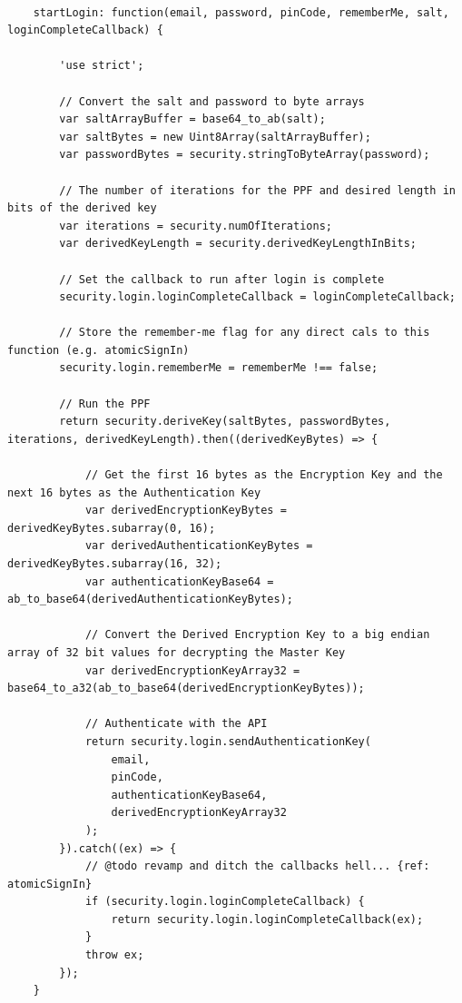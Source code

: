 \documentclass[letter,12pt]{article}
\begin{document}
\begin{verbatim}
    
    startLogin: function(email, password, pinCode, rememberMe, salt, loginCompleteCallback) {

        'use strict';

        // Convert the salt and password to byte arrays
        var saltArrayBuffer = base64_to_ab(salt);
        var saltBytes = new Uint8Array(saltArrayBuffer);
        var passwordBytes = security.stringToByteArray(password);

        // The number of iterations for the PPF and desired length in bits of the derived key
        var iterations = security.numOfIterations;
        var derivedKeyLength = security.derivedKeyLengthInBits;

        // Set the callback to run after login is complete
        security.login.loginCompleteCallback = loginCompleteCallback;

        // Store the remember-me flag for any direct cals to this function (e.g. atomicSignIn)
        security.login.rememberMe = rememberMe !== false;

        // Run the PPF
        return security.deriveKey(saltBytes, passwordBytes, iterations, derivedKeyLength).then((derivedKeyBytes) => {

            // Get the first 16 bytes as the Encryption Key and the next 16 bytes as the Authentication Key
            var derivedEncryptionKeyBytes = derivedKeyBytes.subarray(0, 16);
            var derivedAuthenticationKeyBytes = derivedKeyBytes.subarray(16, 32);
            var authenticationKeyBase64 = ab_to_base64(derivedAuthenticationKeyBytes);

            // Convert the Derived Encryption Key to a big endian array of 32 bit values for decrypting the Master Key
            var derivedEncryptionKeyArray32 = base64_to_a32(ab_to_base64(derivedEncryptionKeyBytes));

            // Authenticate with the API
            return security.login.sendAuthenticationKey(
                email,
                pinCode,
                authenticationKeyBase64,
                derivedEncryptionKeyArray32
            );
        }).catch((ex) => {
            // @todo revamp and ditch the callbacks hell... {ref: atomicSignIn}
            if (security.login.loginCompleteCallback) {
                return security.login.loginCompleteCallback(ex);
            }
            throw ex;
        });
    }

\end{verbatim}
\end{document}
